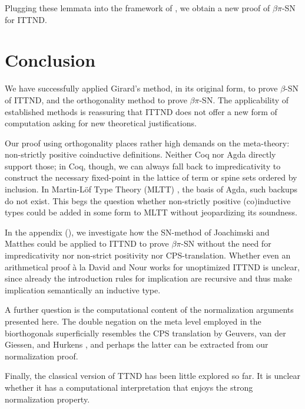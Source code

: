\documentclass[a4paper,USenglish,cleveref, autoref, thm-restate]{lipics-v2019}
\begin{document}
Plugging these lemmata into the framework of , we
obtain a new proof of $\beta\pi$-SN for ITTND.

\section{Conclusion}
\label{sec:concl}

We have successfully applied Girard's method, in its original form, to
prove $\beta$-SN of ITTND, and the orthogonality method to prove
$\beta\pi$-SN.  The applicability of established methods is reassuring
that ITTND does not offer a new form of computation asking for new
theoretical justifications.

Our proof using orthogonality places rather high demands on the
meta-theory: non-strictly positive coinductive definitions.  Neither
Coq nor Agda directly support those; in Coq, though, we can always
fall back to impredicativity to construct the necessary fixed-point in
the lattice of term or spine sets ordered by inclusion.  In
Martin-L\"of Type Theory (MLTT) \cite{MartinLoef84}, the basis of
Agda, such backups do not exist.  This begs the question whether
non-strictly positive (co)inductive types could be added in some form
to MLTT without jeopardizing its soundness.

In the appendix (), we investigate how
the SN-method of
Joachimski and Matthes \cite{matthes:shortproofs,matthes:classlog}
could be applied to
ITTND to prove $\beta\pi$-SN without the need for impredicativity nor
non-strict positivity nor CPS-translation.  Whether even an
arithmetical proof \`a la David and Nour
\cite{david:normWithoutRed,davidNour:tlca05} works for unoptimized
ITTND is unclear, since already the introduction rules for implication
are recursive and thus make implication semantically an inductive type.

A further question is the computational content of the normalization
arguments presented here.  The double negation on the meta level
employed in the biorthogonals superficially resembles the CPS
translation by Geuvers, van der Giessen, and Hurkens
\cite{geuversGiessenHurkens:fundinf19}, and perhaps the latter can be
extracted from our normalization proof.

Finally, the classical version of TTND has been little explored so
far.  It is unclear whether it has a computational interpretation that
enjoys the strong normalization property.







\clearpage

\appendix


\end{document}
